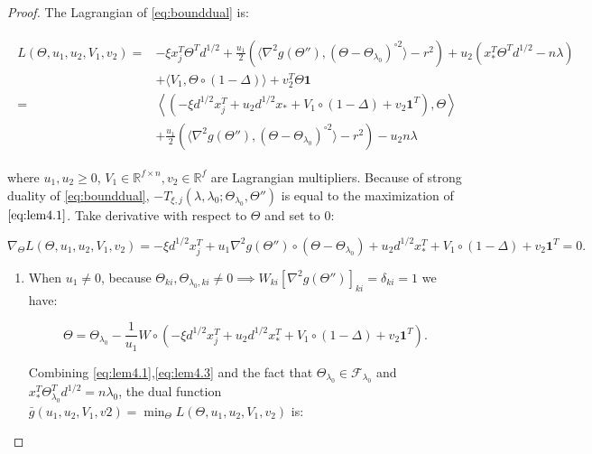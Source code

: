 \documentclass{article}
\begin{document}
\begin{proof}
The Lagrangian of \eqref{eq:bounddual} is:

\begin{gather}
    \label{eq:lem4.1}
    \begin{aligned}
        L(\Theta,u_1,u_2,V_1,v_2)=&-\xi x_j^T\Theta^T d^{1/2}+\frac{u_1}{2}\left(\langle\nabla^2 g(\Theta''),(\Theta-\Theta_{\lambda_0})^{\circ 2}\rangle-r^2\right)+u_2\left(x_*^T\Theta^Td^{1/2}-n\lambda\right)\\
        &+\langle V_1,\Theta\circ(1-\Delta)\rangle+v_2^T\Theta\mathbf{1}\\
        =&\left\langle\left(-\xi d^{1/2}x_j^T+u_2d^{1/2}x_*+V_1\circ(1-\Delta)+v_2\mathbf{1}^T\right),\Theta\right\rangle
        \\
        &+\frac{u_1}{2}\left(\langle\nabla^2 g(\Theta''),(\Theta-\Theta_{\lambda_0})^{\circ 2}\rangle-r^2\right)-u_2n\lambda
    \end{aligned}
\end{gather}

where $u_1,u_2\geq 0$, $V_1\in\mathbb{R}^{f\times n},v_2\in\mathbb{R}^f$ are Lagrangian multipliers. Because of strong duality of \eqref{eq:bounddual}, $-T_{\xi,j}(\lambda,\lambda_0;\Theta_{\lambda_0},\Theta'')$ is equal to the maximization of $\eqref{eq:lem4.1}$. Take derivative with respect to $\Theta$ and set to 0:

\begin{equation}
    \label{eq:lem4.2}
    \nabla_\Theta L(\Theta,u_1,u_2,V_1,v_2)=-\xi d^{1/2}x_j^T+u_1\nabla^2g(\Theta'')\circ(\Theta-\Theta_{\lambda_0})+u_2d^{1/2}x_*^T+V_1\circ(1-\Delta)+v_2\mathbf{1}^T=0.
\end{equation}

\begin{enumerate}
    \item When $u_1\neq 0$, because $\Theta_{ki},\Theta_{\lambda_0,ki}\neq0\implies W_{ki}[\nabla^2g(\Theta'')]_{ki}=\delta_{ki}=1$ we have:

\begin{equation}
    \label{eq:lem4.3}
    \Theta=\Theta_{\lambda_0}-\frac{1}{u_1}W\circ\left(-\xi d^{1/2}x_j^T+u_2d^{1/2}x_*^T+V_1\circ(1-\Delta)+v_2\mathbf{1}^T\right).
\end{equation}

Combining \eqref{eq:lem4.1},\eqref{eq:lem4.3} and the fact that $\Theta_{\lambda_0}\in\mathcal{F}_{\lambda_0}$ and $x_*^T\Theta_{\lambda_0}^Td^{1/2}=n\lambda_0$, the dual function $\bar{g}(u_1,u_2,V_1,v2)=\min_\Theta L(\Theta,u_1,u_2,V_1,v_2)$ is:


\end{enumerate}
\end{proof}
\end{document}
